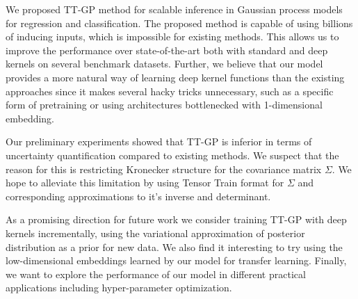 We proposed TT-GP method for scalable inference in Gaussian process models
for regression and classification.  The proposed method is capable of using
billions of inducing inputs, which is impossible for existing methods. This allows us to improve the
performance over state-of-the-art both with standard and deep kernels
on several benchmark datasets.
Further, we believe that our model provides a more natural way of learning deep
kernel functions than the existing approaches since it makes several hacky tricks
unnecessary, such as a specific form of pretraining or using architectures
bottlenecked with 1-dimensional embedding.

Our preliminary experiments showed that TT-GP is inferior in terms of
uncertainty quantification compared to existing methods. We suspect that the
reason for this is restricting Kronecker structure for the covariance matrix $\Sigma$. We hope to
alleviate this limitation by using Tensor Train format for $\Sigma$ and corresponding approximations to it's inverse and determinant.

As a promising direction for future work we consider training TT-GP
with deep kernels incrementally, using the variational approximation
of posterior distribution as a prior for new data. We also find it interesting
to try using the low-dimensional embeddings learned by our model for transfer learning. Finally, we want to
explore the performance of our model in different practical applications including hyper-parameter optimization.

